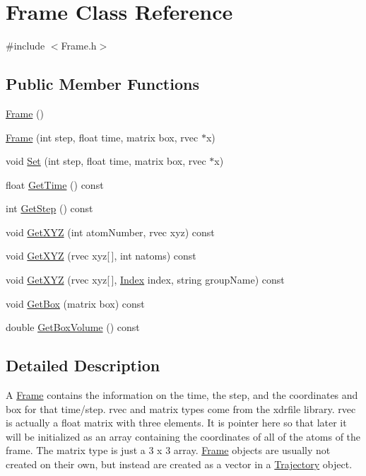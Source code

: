 \hypertarget{classFrame}{\section{Frame Class Reference}
\label{classFrame}
}


{\ttfamily \#include $<$Frame.\-h$>$}

\subsection*{Public Member Functions}
\begin{DoxyCompactItemize}
\item 
\hyperlink{classFrame_ad2e5946cf41d4817e750500acf05d02b}{Frame} ()
\item 
\hyperlink{classFrame_a0f3ba7abc832b6ca9d0401a9e5cfc4a0}{Frame} (int step, float time, matrix box, rvec $\ast$x)
\item 
void \hyperlink{classFrame_affdb660765a1737e7c838c74e307d707}{Set} (int step, float time, matrix box, rvec $\ast$x)
\item 
float \hyperlink{classFrame_a9125c618fbb0791eab0576086cb562d6}{Get\-Time} () const 
\item 
int \hyperlink{classFrame_a4b383d191c043db5ee263446a2ea7a71}{Get\-Step} () const 
\item 
void \hyperlink{classFrame_a33cbc8fc6d471fd20e1e7098a3e43d03}{Get\-X\-Y\-Z} (int atom\-Number, rvec xyz) const 
\item 
void \hyperlink{classFrame_a57fe1db79f90b9ac76403218575ce0c6}{Get\-X\-Y\-Z} (rvec xyz\mbox{[}$\,$\mbox{]}, int natoms) const 
\item 
void \hyperlink{classFrame_a30f7ae8214a62f1962323e6aebfddf9e}{Get\-X\-Y\-Z} (rvec xyz\mbox{[}$\,$\mbox{]}, \hyperlink{classIndex}{Index} index, string group\-Name) const 
\item 
void \hyperlink{classFrame_a7b747f3795eb785eb9275f1c793c6695}{Get\-Box} (matrix box) const 
\item 
double \hyperlink{classFrame_a3676c3640f6047a77e5671f7171ba5f3}{Get\-Box\-Volume} () const 
\end{DoxyCompactItemize}


\subsection{Detailed Description}
A \hyperlink{classFrame}{Frame} contains the information on the time, the step, and the coordinates and box for that time/step. rvec and matrix types come from the xdrfile library. rvec is actually a float matrix with three elements. It is pointer here so that later it will be initialized as an array containing the coordinates of all of the atoms of the frame. The matrix type is just a 3 x 3 array. \hyperlink{classFrame}{Frame} objects are usually not created on their own, but instead are created as a vector in a \hyperlink{classTrajectory}{Trajectory} object. 

